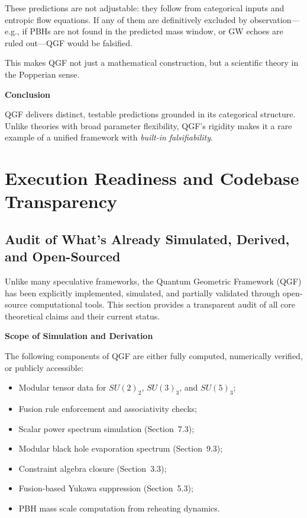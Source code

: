 \documentclass[11pt]{article}
\begin{document}
These predictions are not adjustable: they follow from categorical inputs and entropic flow equations. If any of them are definitively excluded by observation—e.g., if PBHs are not found in the predicted mass window, or GW echoes are ruled out—QGF would be falsified.

This makes QGF not just a mathematical construction, but a scientific theory in the Popperian sense.

\vspace{0.5em}
\noindent\textbf{Conclusion}

QGF delivers distinct, testable predictions grounded in its categorical structure. Unlike theories with broad parameter flexibility, QGF’s rigidity makes it a rare example of a unified framework with \textit{built-in falsifiability}.



\section{Execution Readiness and Codebase Transparency}

\subsection{Audit of What’s Already Simulated, Derived, and Open-Sourced}

Unlike many speculative frameworks, the Quantum Geometric Framework (QGF) has been explicitly implemented, simulated, and partially validated through open-source computational tools. This section provides a transparent audit of all core theoretical claims and their current status.

\vspace{0.5em}
\noindent\textbf{Scope of Simulation and Derivation}

The following components of QGF are either fully computed, numerically verified, or publicly accessible:

\begin{itemize}
  \item Modular tensor data for \( SU(2)_2 \), \( SU(3)_3 \), and \( SU(5)_3 \);
  \item Fusion rule enforcement and associativity checks;
  \item Scalar power spectrum simulation (Section~7.3);
  \item Modular black hole evaporation spectrum (Section~9.3);
  \item Constraint algebra closure (Section~3.3);
  \item Fusion-based Yukawa suppression (Section~5.3);
  \item PBH mass scale computation from reheating dynamics.
\end{itemize}
\end{document}
